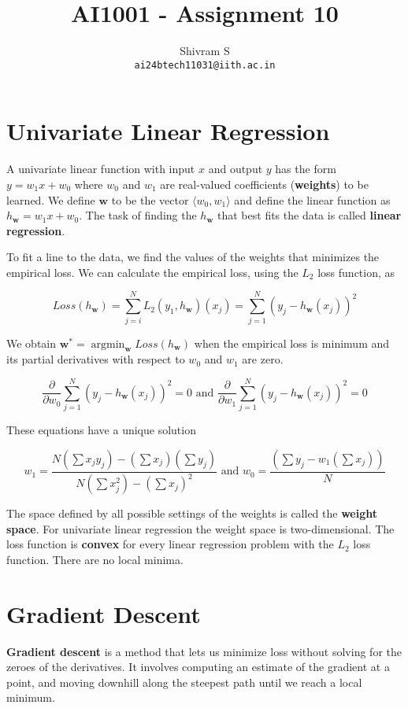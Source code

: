 \documentclass{article}
\author{Shivram S \\ \texttt{ai24btech11031@iith.ac.in}}
\title{AI1001 - Assignment 10}
\DeclareMathOperator*{\argmin}{argmin}
\begin{document}
\maketitle

\section{Univariate Linear Regression}

A univariate linear function with input $x$ and output $y$ has the form $y = w_1x + w_0$
where $w_0$ and $w_1$ are real-valued coefficients (\textbf{weights}) to be learned.
We define $\textbf{w}$ to be the vector $\langle w_0, w_1 \rangle$ and define the
linear function as $h_{\textbf{w}} = w_1x + w_0$. The task of finding the $h_{\textbf{w}}$
that best fits the data is called \textbf{linear regression}.

To fit a line to the data, we find the values of the weights that minimizes the
empirical loss. We can calculate the empirical loss, using the $L_2$ loss function, as 

\[
Loss(h_{\textbf{w}}) = \sum_{j=i}^N L_2(y_1, h_{\textbf{w}})(x_j) = \sum_{j=1}^N (y_j - h_{\textbf{w}}(x_j))^2
\]

We obtain $\textbf{w}^* = \argmin_{\textbf{w}} Loss(h_{\textbf{w}})$ when the empirical
loss is minimum and its partial derivatives with respect to $w_0$ and $w_1$ are zero.

\[
\frac{\partial}{\partial w_0} \sum_{j=1}^N (y_j - h_{\textbf{w}}(x_j))^2 = 0
\text{ and } \frac{\partial}{\partial w_1} \sum_{j=1}^N (y_j - h_{\textbf{w}}(x_j))^2 = 0
\]

These equations have a unique solution

\[
w_1 = \frac{N(\sum x_jy_j) - (\sum x_j)(\sum y_j)}{N(\sum x_j^2) - (\sum x_j)^2}
\text{ and } w_0 = \frac{\left(\sum y_j - w_1\left(\sum x_j \right) \right)}{N}
\]

The space defined by all possible settings of the weights is called the \textbf{weight space}.
For univariate linear regression the weight space is two-dimensional. The loss function
is \textbf{convex} for every linear regression problem with the $L_2$ loss function.
There are no local minima.

\section{Gradient Descent}

\textbf{Gradient descent} is a method that lets us minimize loss without solving for the 
zeroes of the derivatives. It involves computing an estimate of the gradient at a point,
and moving downhill along the steepest path until we reach a local minimum.
\end{document}
